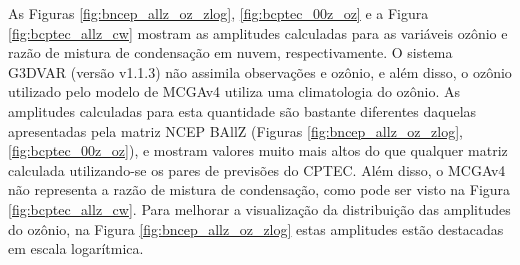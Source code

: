 \begin{figure}[H]
\begin{center}
  \end{center} 
  \vspace{2mm}
  \legenda{}
  \label{fig:B_mcgav4_ps}
\end{figure}

As Figuras \ref{fig:bncep_allz_oz_zlog}, \ref{fig:bcptec_00z_oz} e a Figura \ref{fig:bcptec_allz_cw} mostram as amplitudes calculadas para as variáveis ozônio e razão de mistura de condensação em nuvem, respectivamente. O sistema G3DVAR (versão v1.1.3) não assimila observações e ozônio, e além disso, o ozônio utilizado pelo modelo de MCGAv4 utiliza uma climatologia do ozônio. As amplitudes calculadas para esta quantidade são bastante diferentes daquelas apresentadas pela matriz NCEP BAllZ (Figuras \ref{fig:bncep_allz_oz_zlog}, \ref{fig:bcptec_00z_oz}), e mostram valores muito mais altos do que qualquer matriz calculada utilizando-se os pares de previsões do CPTEC. Além disso, o MCGAv4 não representa a razão de mistura de condensação, como pode ser visto na Figura \ref{fig:bcptec_allz_cw}. Para melhorar a visualização da distribuição das amplitudes do ozônio, na Figura \ref{fig:bncep_allz_oz_zlog} estas amplitudes estão destacadas em escala logarítmica. 

